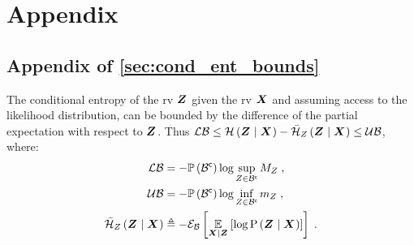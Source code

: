 \chapter{Appendix}\label{sec:app}

\section{Appendix of \cref{sec:cond_ent_bounds}}
\begin{proposition}
	\label{thm:observation_bounds}
	The conditional entropy of the \gls{rv} $\boldsymbol Z_{}$ given the \gls{rv} $\boldsymbol X_{}$ and assuming access to the likelihood distribution, can be bounded by the difference of the partial expectation with respect to $\boldsymbol Z_{}$. Thus $\operatorname*{\mathcal{LB}}\leq\mathcal{H}\left({\boldsymbol Z_{}}\mid{\ensuremath{\boldsymbol X_{}}}\right)-\bar{\mathcal{H}}_{Z_{}}\left({\boldsymbol Z_{}}\mid{\ensuremath{\boldsymbol X_{}}}\right)\leq\operatorname*{\mathcal{UB}}$, where:
	\begin{subequations}
		\begin{align}
			\operatorname*{\mathcal{LB}}&=-\mathbb{P}\left({{\mathcal B}^{\mathsf{c}}}\right)\log\sup_{Z_{}\in{\ensuremath{\mathcal B}}^{\mathsf{c}}}M_{Z_{}}\;,\\
			\operatorname*{\mathcal{UB}}& =-\mathbb{P}\left({{\mathcal B}^{\mathsf{c}}}\right)\log\inf_{Z_{}\in{\ensuremath{\mathcal B}}^{\mathsf{c}}}m_{Z_{}}\;,\\
			\bar{\mathcal{H}}_{Z_{}}\left({\boldsymbol Z_{}}\mid{\ensuremath{\boldsymbol X_{}}}\right) &\triangleq-\mathcal{E}_{\mathcal B}\left[{\operatorname*{\mathbb{E}}\limits_{\boldsymbol X_{}\mid\boldsymbol Z_{}}\left[{\log\mathrm{P}\left({\boldsymbol Z_{}}\mid{\ensuremath{\boldsymbol X_{}}}\right)}\right]}\right]\;.
		\end{align}
	\end{subequations}
\end{proposition}
